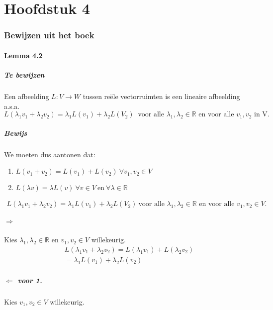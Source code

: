 \documentclass[lineaire_algebra_oplossingen.tex]{subfiles}
\begin{document}
\newpage
\part{Hoofdstuk 4}
\section{Bewijzen uit het boek}
\subsection{Lemma 4.2}
\subsubsection*{Te bewijzen}
Een afbeelding $L:V\rightarrow W$ tussen re\"ele vectorruimten is een lineaire afbeelding a.s.a.
$$L(\lambda_1v_1+\lambda_2v_2) = \lambda_1L(v_1)+\lambda_2L(V_2)\ \text{ voor alle } \lambda_1,\lambda_2 \in \mathbb{R} \text{ en voor alle } v_1,v_2 \text{ in V.}$$
\subsubsection*{Bewijs}
We moeten dus aantonen dat:
\begin{enumerate}
\item $L(v_1+v_2) = L(v_1) + L(v_2) \ \forall v_1,v_2 \in V$
\item $L(\lambda v) = \lambda L(v) \ \forall v \in V \ \text{en} \ \forall \lambda \in \mathbb{R}$
\end{enumerate}
\begin{align*}L(\lambda_1v_1+\lambda_2v_2) = \lambda_1L(v_1)+\lambda_2L(V_2)\ \text{voor alle $\lambda_1,\lambda_2 \in \mathbb{R}$ en voor alle $v_1,v_2 \in V$}. \tag{3.}
\end{align*}

\subsubsection*{$\Rightarrow$}
Kies $\lambda_1,\lambda_2 \in \mathbb{R}$ en $v_1,v_2 \in V$ willekeurig.
\begin{align*}
L(\lambda_1 v_1 + \lambda_2 v_2) = L(\lambda_1 v_1) + L(\lambda_2 v_2)\tag{wegens 1.}\\
=\lambda_1 L(v_1)+ \lambda_2 L(v_2) \tag{wegens 2.}
\end{align*}

\subsubsection*{$\Leftarrow$ voor 1.}
Kies $v_1,v_2 \in V$ willekeurig.
\end{document}
